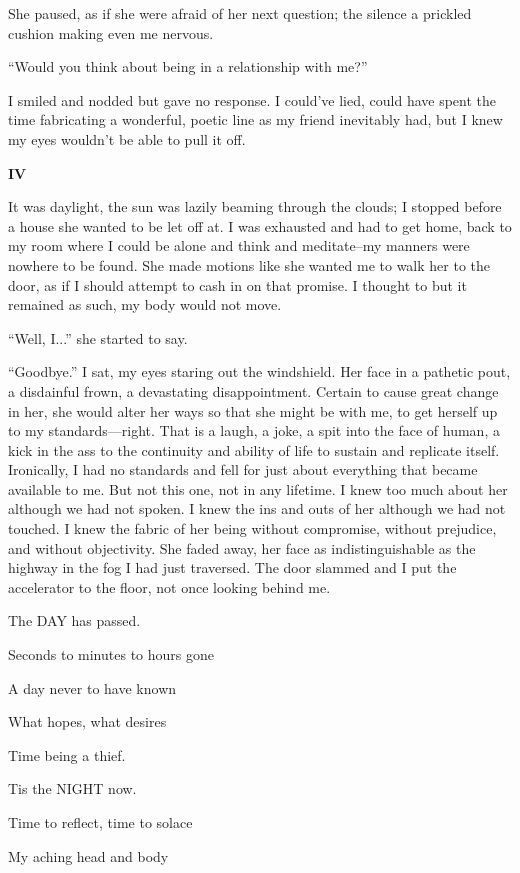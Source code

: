 \documentclass[
]{article}
\begin{document}
She paused, as if she were afraid of her next question; the silence a
prickled cushion making even me nervous.

``Would you think about being in a relationship with me?''

I smiled and nodded but gave no response. I could've lied, could have
spent the time fabricating a wonderful, poetic line as my friend
inevitably had, but I knew my eyes wouldn't be able to pull it off.

\textbf{IV}

It was daylight, the sun was lazily beaming through the clouds; I
stopped before a house she wanted to be let off at. I was exhausted and
had to get home, back to my room where I could be alone and think and
meditate--my manners were nowhere to be found. She made motions like she
wanted me to walk her to the door, as if I should attempt to cash in on
that promise. I thought to but it remained as such, my body would not
move.

``Well, I...'' she started to say.

``Goodbye.'' I sat, my eyes staring out the windshield. Her face in a
pathetic pout, a disdainful frown, a devastating disappointment. Certain
to cause great change in her, she would alter her ways so that she might
be with me, to get herself up to my standards---right. That is a laugh,
a joke, a spit into the face of human, a kick in the ass to the
continuity and ability of life to sustain and replicate itself.
Ironically, I had no standards and fell for just about everything that
became available to me. But not this one, not in any lifetime. I knew
too much about her although we had not spoken. I knew the ins and outs
of her although we had not touched. I knew the fabric of her being
without compromise, without prejudice, and without objectivity. She
faded away, her face as indistinguishable as the highway in the fog I
had just traversed. The door slammed and I put the accelerator to the
floor, not once looking behind me.

The DAY has passed.

Seconds to minutes to hours gone

A day never to have known

What hopes, what desires

Time being a thief.

Tis the NIGHT now.

Time to reflect, time to solace

My aching head and body
\end{document}
